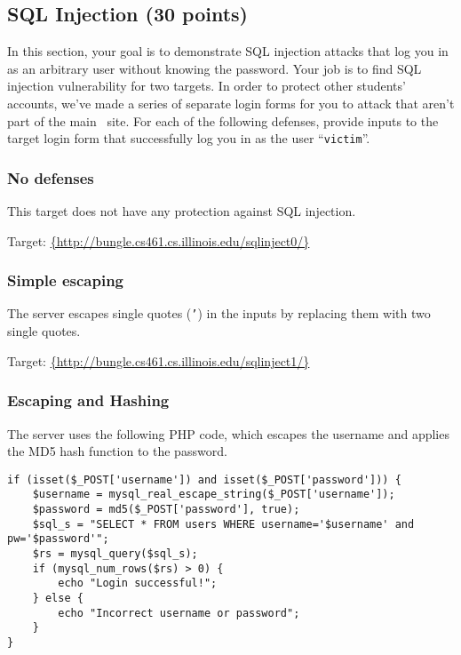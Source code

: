 \documentclass[letterpaper,12pt]{report}
\newcommand{\bungledomain}{http://bungle.cs461.cs.illinois.edu}
\begin{document}
\subsection{SQL Injection (30 points)}
\label{sec:sql_injection}
In this section, your goal is to demonstrate SQL injection attacks that log you in as an arbitrary user without knowing the password. Your job is to find SQL injection vulnerability for two targets. In order to protect other students' accounts, we've made a series of separate login forms for you to attack that aren't part of the main \bungle\ site.  For each of the following defenses, provide inputs to the target login form that successfully log you in as the user ``\texttt{victim}''.

\subsubsection{No defenses}
\label{sec:sql_no_defenses}
This target does not have any protection against SQL injection.
\smallskip

Target: \url{{\bungledomain/sqlinject0/}}

\subsubsection{Simple escaping}
\label{sec:sql_simple_escaping}
The server escapes single quotes (\texttt{'}) in the inputs by replacing them with two single quotes.
\smallskip

Target: \url{{\bungledomain/sqlinject1/}}\\

\subsubsection{Escaping and Hashing}
\label{sec:sql_md5}
The server uses the following PHP code, which escapes the username and applies the MD5 hash function to the password.
{\vspace{-10pt}\small\begin{verbatim}
if (isset($_POST['username']) and isset($_POST['password'])) {
    $username = mysql_real_escape_string($_POST['username']);
    $password = md5($_POST['password'], true);
    $sql_s = "SELECT * FROM users WHERE username='$username' and pw='$password'";
    $rs = mysql_query($sql_s);
    if (mysql_num_rows($rs) > 0) {
        echo "Login successful!";
    } else {
        echo "Incorrect username or password";
    }
}
\end{verbatim}}
\vspace{-10pt}
\end{document}
